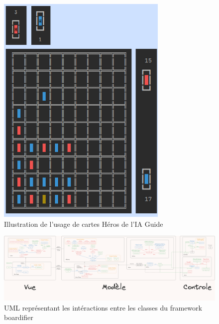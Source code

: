 \begin{figure}[h]
    \centering
    \includegraphics[width=\textwidth,angle=0]{./images/Guide.png}
    \caption{Illustration de l'usage de cartes Héros de l'IA Guide}
    \label{fig:guide1}
\end{figure}

\begin{figure}[h]
    \centering
    \includegraphics[width=24cm,angle=270]{./images/UML_boardifier_console.png}
    \caption{UML représentant les intéractions entre les classes du framework boardifier}
    \label{fig:uml}
\end{figure}





